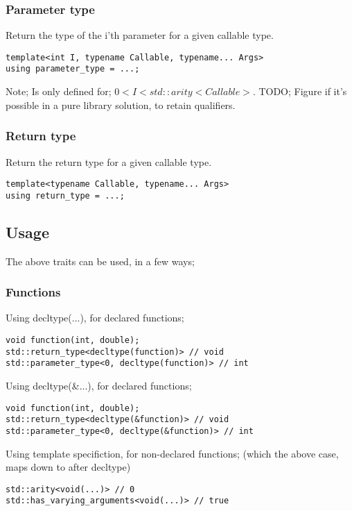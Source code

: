 \subsubsection{Parameter type}
Return the type of the i'th parameter for a given callable type.
\begin{verbatim}
template<int I, typename Callable, typename... Args>
using parameter_type = ...;
\end{verbatim}
Note; Is only defined for; $0 < I < std::arity<Callable>$.
TODO; Figure if it's possible in a pure library solution, to retain qualifiers. 

\subsubsection{Return type}
Return the return type for a given callable type.
\begin{verbatim}
template<typename Callable, typename... Args>
using return_type = ...;
\end{verbatim}

\subsection{Usage}
The above traits can be used, in a few ways;
\subsubsection{Functions}
Using decltype(...), for declared functions;
\begin{verbatim}
void function(int, double);
std::return_type<decltype(function)> // void
std::parameter_type<0, decltype(function)> // int
\end{verbatim}
Using decltype(\&...), for declared functions;
\begin{verbatim}
void function(int, double);
std::return_type<decltype(&function)> // void
std::parameter_type<0, decltype(&function)> // int
\end{verbatim}

Using template specifiction, for non-declared functions;
(which the above case, maps down to after decltype)
\begin{verbatim}
std::arity<void(...)> // 0
std::has_varying_arguments<void(...)> // true
\end{verbatim}

